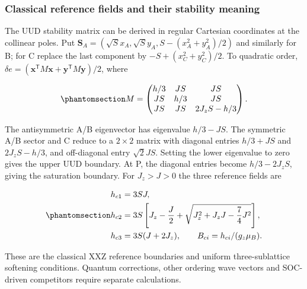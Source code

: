 \subsubsection{Classical reference fields and their stability
meaning}\label{classical-reference-fields-and-their-stability-meaning}

The UUD stability matrix can be derived in regular Cartesian coordinates
at the collinear poles. Put
\(\mathbf S_A=(\sqrt S x_A,\sqrt S y_A,S-(x_A^2+y_A^2)/2)\) and
similarly for B; for C replace the last component by
\(-S+(x_C^2+y_C^2)/2\). To quadratic order,
\(\delta e=(\mathbf x^{\mathsf T}M\mathbf x+\mathbf y^{\mathsf T}M\mathbf y)/2\),
where

\begin{equation}\phantomsection\label{eq-nbcp-uud-hessian}{
M=\begin{pmatrix}
h/3&JS&JS\\
JS&h/3&JS\\
JS&JS&2J_zS-h/3
\end{pmatrix}.
}\end{equation}

The antisymmetric A/B eigenvector has eigenvalue \(h/3-JS\). The
symmetric A/B sector and C reduce to a \(2\times2\) matrix with diagonal
entries \(h/3+JS\) and \(2J_zS-h/3\), and off-diagonal entry
\(\sqrt2JS\). Setting the lower eigenvalue to zero gives the upper UUD
boundary. At P, the diagonal entries become \(h/3-2J_zS\), giving the
saturation boundary. For \(J_z>J>0\) the three reference fields are

\begin{equation}\phantomsection\label{eq-nbcp-critical-fields}{
\begin{aligned}
h_{c1}&=3SJ,\\
h_{c2}&=3S\left[J_z-\frac J2+
\sqrt{J_z^2+J_zJ-\frac74J^2}\right],\\
h_{c3}&=3S(J+2J_z),\qquad B_{ci}=h_{ci}/(g_z\mu_B).
\end{aligned}
}\end{equation}

These are the classical XXZ reference boundaries and uniform
three-sublattice softening conditions. Quantum corrections, other
ordering wave vectors and SOC-driven competitors require separate
calculations.

